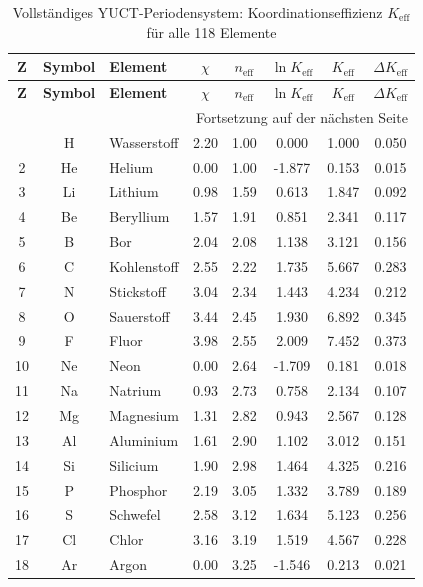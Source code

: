 \documentclass[12pt,a4paper]{article}
\newcommand{\Keff}{K_{\mathrm{eff}}}
\begin{document}
	\begin{longtable}{|c|c|p{2.5cm}|c|c|c|c|c|}
		\caption{Vollständiges YUCT-Periodensystem: Koordinationseffizienz $\Keff$ für alle 118 Elemente}
		\label{tab:complete-periodic} \\
		\hline
		\textbf{Z} & \textbf{Symbol} & \textbf{Element} & $\chi$ & $n_{\text{eff}}$ & $\ln \Keff$ & $\Keff$ & $\Delta \Keff$ \\
		\hline
		\endfirsthead
		\hline
		\textbf{Z} & \textbf{Symbol} & \textbf{Element} & $\chi$ & $n_{\text{eff}}$ & $\ln \Keff$ & $\Keff$ & $\Delta \Keff$ \\
		\hline
		\endhead
		\hline \multicolumn{8}{|r|}{{Fortsetzung auf der nächsten Seite}} \\ \hline
		\endfoot
		\hline
		\endlastfoot
		1 & H & Wasserstoff & 2.20 & 1.00 & 0.000 & 1.000 & 0.050 \\
		2 & He & Helium & 0.00 & 1.00 & -1.877 & 0.153 & 0.015 \\
		3 & Li & Lithium & 0.98 & 1.59 & 0.613 & 1.847 & 0.092 \\
		4 & Be & Beryllium & 1.57 & 1.91 & 0.851 & 2.341 & 0.117 \\
		5 & B & Bor & 2.04 & 2.08 & 1.138 & 3.121 & 0.156 \\
		6 & C & Kohlenstoff & 2.55 & 2.22 & 1.735 & 5.667 & 0.283 \\
		7 & N & Stickstoff & 3.04 & 2.34 & 1.443 & 4.234 & 0.212 \\
		8 & O & Sauerstoff & 3.44 & 2.45 & 1.930 & 6.892 & 0.345 \\
		9 & F & Fluor & 3.98 & 2.55 & 2.009 & 7.452 & 0.373 \\
		10 & Ne & Neon & 0.00 & 2.64 & -1.709 & 0.181 & 0.018 \\
		11 & Na & Natrium & 0.93 & 2.73 & 0.758 & 2.134 & 0.107 \\
		12 & Mg & Magnesium & 1.31 & 2.82 & 0.943 & 2.567 & 0.128 \\
		13 & Al & Aluminium & 1.61 & 2.90 & 1.102 & 3.012 & 0.151 \\
		14 & Si & Silicium & 1.90 & 2.98 & 1.464 & 4.325 & 0.216 \\
		15 & P & Phosphor & 2.19 & 3.05 & 1.332 & 3.789 & 0.189 \\
		16 & S & Schwefel & 2.58 & 3.12 & 1.634 & 5.123 & 0.256 \\
		17 & Cl & Chlor & 3.16 & 3.19 & 1.519 & 4.567 & 0.228 \\
		18 & Ar & Argon & 0.00 & 3.25 & -1.546 & 0.213 & 0.021 \\

\end{longtable}
\end{document}
